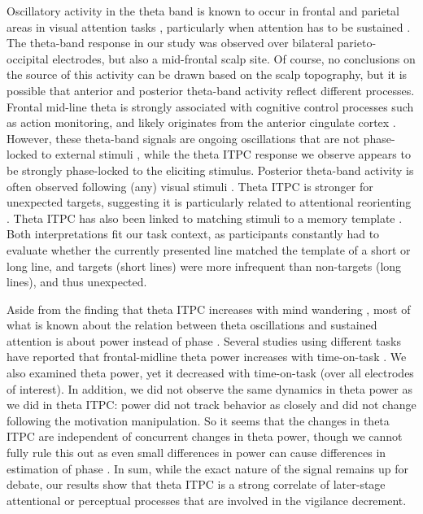 \documentclass[11pt,]{memoir}
\begin{document}
Oscillatory activity in the theta band is known to occur in frontal and parietal areas in visual attention tasks \autocite{Demiralp1992}, particularly when attention has to be sustained \autocite{Clayton2015}. The theta-band response in our study was observed over bilateral parieto-occipital electrodes, but also a mid-frontal scalp site. Of course, no conclusions on the source of this activity can be drawn based on the scalp topography, but it is possible that anterior and posterior theta-band activity reflect different processes. Frontal mid-line theta is strongly associated with cognitive control processes such as action monitoring, and likely originates from the anterior cingulate cortex \autocites{Cavanagh2014}{Narayanan2013}. However, these theta-band signals are ongoing oscillations that are not phase-locked to external stimuli \autocite{Cohen2013}, while the theta ITPC response we observe appears to be strongly phase-locked to the eliciting stimulus. Posterior theta-band activity is often observed following (any) visual stimuli \autocite{Klimesch2007}. Theta ITPC is stronger for unexpected targets, suggesting it is particularly related to attentional reorienting \autocite{Daitch2013}. Theta ITPC has also been linked to matching stimuli to a memory template \autocites{Freunberger2007}{Rizzuto2006}. Both interpretations fit our task context, as participants constantly had to evaluate whether the currently presented line matched the template of a short or long line, and targets (short lines) were more infrequent than non-targets (long lines), and thus unexpected.

Aside from the finding that theta ITPC increases with mind wandering \autocite{Baird2014}, most of what is known about the relation between theta oscillations and sustained attention is about power instead of phase \autocite{Clayton2015}. Several studies using different tasks have reported that frontal-midline theta power increases with time-on-task \autocites{Boksem2005}{Umemoto2018}{Wascher2014}[but see][]{Bonnefond2011}. We also examined theta power, yet it decreased with time-on-task (over all electrodes of interest). In addition, we did not observe the same dynamics in theta power as we did in theta ITPC: power did not track behavior as closely and did not change following the motivation manipulation. So it seems that the changes in theta ITPC are independent of concurrent changes in theta power, though we cannot fully rule this out as even small differences in power can cause differences in estimation of phase \autocite{VanDiepen2018}. In sum, while the exact nature of the signal remains up for debate, our results show that theta ITPC is a strong correlate of later-stage attentional or perceptual processes that are involved in the vigilance decrement.
\end{document}
